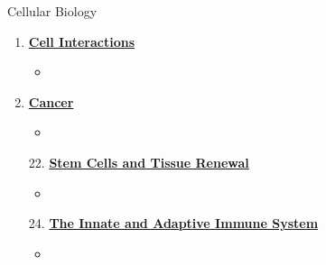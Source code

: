 \documentclass[12pt,letterpaper]{article}
\newcommand{\thetitle}{\hypertarget{home}{Cellular Biology}}
\begin{document}
\begin{chapbox}{Cellular Biology}
{\begin{enumerate}[font=\bfseries, wide]
\begin{itemize}
        \item 
    \end{itemize}
    \item \hyperlink{19}{\textbf{Cell Interactions}}
    \begin{itemize}
        \item 
    \end{itemize}
    \item \hyperlink{20}{\textbf{Cancer}}
    \begin{itemize}
        \item 
    \end{itemize}    
    \item[22.] \hyperlink{22}{\textbf{Stem Cells and Tissue Renewal}}
    \begin{itemize}
        \item 
    \end{itemize}
    \item[24.] \hyperlink{24}{\textbf{The Innate and Adaptive Immune System}}
    \begin{itemize}
        \item 
    \end{itemize}
\end{enumerate}
}\end{chapbox}
\clearpage





\renewcommand{\thetitle}{\hypertarget{10}{The Genetic Code of Genes
and Genomes}}
\hypertarget{10}{} 
\end{document}

